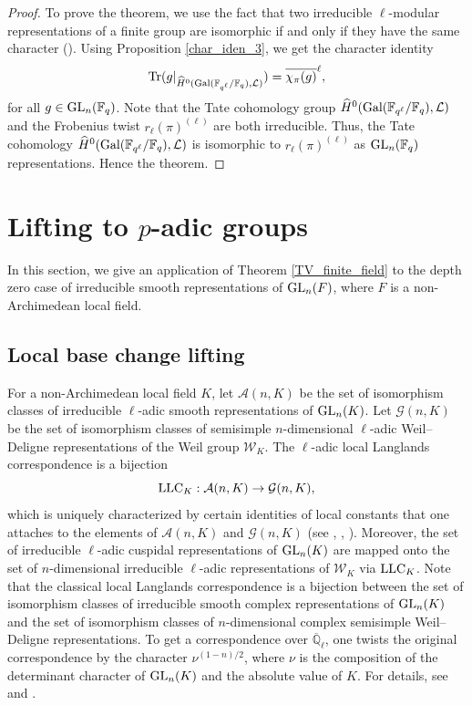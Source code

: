\documentclass[10pt, reqno]{amsart}
\theoremstyle{plain}
\numberwithin{equation}{section} \newcommand{\di}{\operatorname{dim}}
\begin{document}
\begin{proof}
  To prove the theorem, we use the fact that two irreducible
  $\ell$-modular representations of a finite group are isomorphic if
  and only if they have the same character (\cite[Corollary
  7.21]{Lam_noncommutative_rings}). Using Proposition
  \ref{char_iden_3}, we get the character identity
$$ {\rm Tr}(g|_{\widehat{H}^0({\rm
    Gal}(\mathbb{F}_{q^\ell}/\mathbb{F}_q),\mathcal{L})})
= \overline{\chi_\pi(g)}^\ell, $$
for all $g\in {\rm GL}_n(\mathbb{F}_q)$. Note that the Tate cohomology
group
$\widehat{H}^0({\rm
  Gal}(\mathbb{F}_{q^\ell}/\mathbb{F}_q),\mathcal{L})$ and the
Frobenius twist $r_\ell(\pi)^{(\ell)}$ are both irreducible. Thus, the
Tate cohomology
$\widehat{H}^0({\rm
  Gal}(\mathbb{F}_{q^\ell}/\mathbb{F}_q),\mathcal{L})$ is isomorphic
to $r_\ell(\pi)^{(\ell)}$ as ${\rm GL}_n(\mathbb{F}_q)$
representations. Hence the theorem.
\end{proof}

\section{Lifting to 
\texorpdfstring{$p$}{}-adic groups}
In this section, we give an application of Theorem
\ref{TV_finite_field} to the depth zero case of irreducible smooth
representations of ${\rm GL}_n(F)$, where $F$ is a non-Archimedean
local field.
\subsection{Local base change lifting}
For a non-Archimedean local field $K$, let $\mathcal{A}(n,K)$ be the
set of isomorphism classes of irreducible $\ell$-adic smooth
representations of ${\rm GL}_n(K)$.  Let $\mathcal{G}(n,K)$ be the set
of isomorphism classes of semisimple $n$-dimensional $\ell$-adic
Weil--Deligne representations of the Weil group $\mathcal{W}_K$. The
$\ell$-adic local Langlands correspondence is a bijection
$$ {\rm LLC}_K:\mathcal{A}(n,K) 
\rightarrow \mathcal{G}(n,K), $$ which is uniquely characterized by
certain identities of local constants that one attaches to the
elements of $\mathcal{A}(n, K)$ and $\mathcal{G}(n,K)$ (see
\cite{harris_taylor}, \cite{henniart_une_preuve},
\cite{scholze_llc}). Moreover, the set of irreducible $\ell$-adic
cuspidal representations of ${\rm GL}_n(K)$ are mapped onto the set of
$n$-dimensional irreducible $\ell$-adic representations of
$\mathcal{W}_K$ via ${\rm LLC}_K$. Note that the classical local
Langlands correspondence is a bijection between the set of isomorphism
classes of irreducible smooth complex representations of
${\rm GL}_n(K)$ and the set of isomorphism classes of $n$-dimensional complex
semisimple Weil--Deligne representations. To get a correspondence over
$\overline{\mathbb{Q}}_\ell$, one twists the original correspondence
by the character $\nu^{(1-n)/2}$, where $\nu$ is the composition of
the determinant character of ${\rm GL}_n(K)$ and the absolute value of
$K$. For details, see \cite[Conjecture 4.4, Section
4.2]{clozel_motifs} and \cite[Section 7]{henniart_bordeaux}.
\end{document}
